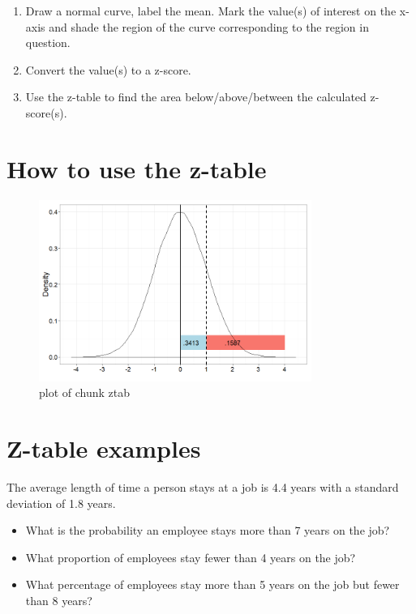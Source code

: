 \documentclass[12pt]{article}
\begin{document}
\begin{enumerate}
\def\labelenumi{\arabic{enumi}.}
\itemsep1pt\parskip0pt
\item
  Draw a normal curve, label the mean. Mark the value(s) of interest on
  the x-axis and shade the region of the curve corresponding to the
  region in question.
\item
  Convert the value(s) to a z-score.
\item
  Use the z-table to find the area below/above/between the calculated
  z-score(s).
\end{enumerate}

\section{How to use the z-table}\label{how-to-use-the-z-table}

\begin{figure}[H]
\centering
\includegraphics[width=3.5in]{figure/ztab-1.png}
\caption{plot of chunk ztab}
\end{figure}

\section{Z-table examples}\label{z-table-examples}

The average length of time a person stays at a job is 4.4 years with a
standard deviation of 1.8 years.

\begin{itemize}
\itemsep1pt\parskip0pt
\item
  What is the probability an employee stays more than 7 years on the
  job?
\item
  What proportion of employees stay fewer than 4 years on the job?
\item
  What percentage of employees stay more than 5 years on the job but
  fewer than 8 years?
\end{itemize}
\end{document}

